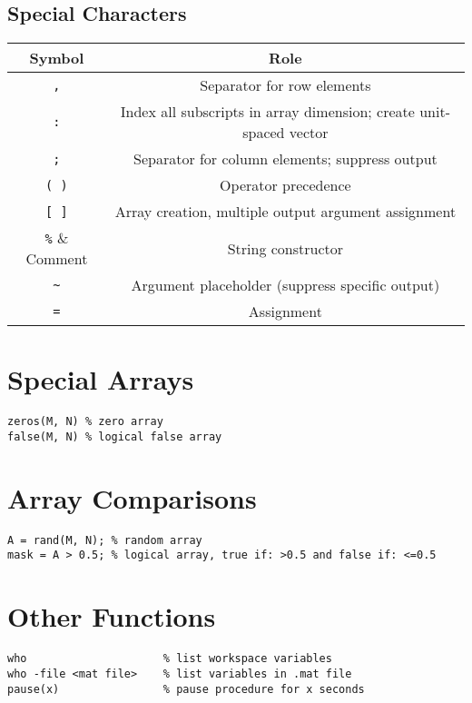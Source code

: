 \documentclass{article}
\begin{document}
\subsection*{Special Characters}
\begin{table}[H]
    \centering
    \begin{tabular}{c | c}
        \toprule
        \textbf{Symbol} & \textbf{Role} \\
        \midrule
        \lstinline!,!   & Separator for row elements \\
        \lstinline!:!   & Index all subscripts in array dimension; create unit-spaced vector \\
        \lstinline!;!   & Separator for column elements; suppress output \\
        \lstinline!( )! & Operator precedence \\
        \lstinline![ ]! & Array creation, multiple output argument assignment \\
        \lstinline!%!   & Comment \\
        \lstinline!""!  & String constructor \\
        \lstinline!~!   & Argument placeholder (suppress specific output) \\
        \lstinline!=!   & Assignment \\
        \bottomrule
    \end{tabular}
\end{table}
\section*{Special Arrays}
\begin{lstlisting}
zeros(M, N) % zero array
false(M, N) % logical false array
\end{lstlisting}
\section*{Array Comparisons}
\begin{lstlisting}
A = rand(M, N); % random array
mask = A > 0.5; % logical array, true if: >0.5 and false if: <=0.5
\end{lstlisting}
\section*{Other Functions}
\begin{lstlisting}
who                     % list workspace variables  
who -file <mat file>    % list variables in .mat file 
pause(x)                % pause procedure for x seconds 
\end{lstlisting}
\end{document}
